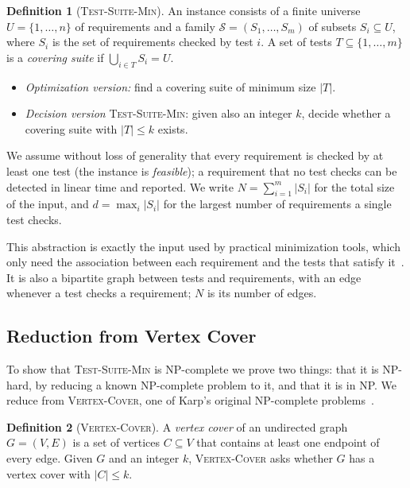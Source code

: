 \documentclass[conference]{IEEEtran}
\theoremstyle{definition}
\newtheorem{definition}{Definition}
\theoremstyle{remark}
\newcommand{\TSM}{\textsc{Test-Suite-Min}}
\newcommand{\VC}{\textsc{Vertex-Cover}}
\begin{document}
\begin{definition}[\TSM{}]
An instance consists of a finite universe $U = \{1,\dots,n\}$ of requirements
and a family $\mathcal{S} = (S_1,\dots,S_m)$ of subsets $S_i \subseteq U$,
where $S_i$ is the set of requirements checked by test $i$. A set of tests
$T \subseteq \{1,\dots,m\}$ is a \emph{covering suite} if
$\bigcup_{i\in T} S_i = U$.
\begin{itemize}
  \item \emph{Optimization version:} find a covering suite of minimum size $|T|$.
  \item \emph{Decision version} \TSM{}: given also an integer $k$, decide
        whether a covering suite with $|T| \le k$ exists.
\end{itemize}
\end{definition}

We assume without loss of generality that every requirement is checked by at
least one test (the instance is \emph{feasible}); a requirement that no test
checks can be detected in linear time and reported. We write
$N = \sum_{i=1}^{m} |S_i|$ for the total size of the input, and
$d = \max_i |S_i|$ for the largest number of requirements a single test checks.

This abstraction is exactly the input used by practical minimization tools,
which only need the association between each requirement and the tests that
satisfy it~\cite{harrold1993}. It is also a bipartite graph between tests and
requirements, with an edge whenever a test checks a requirement; $N$ is its
number of edges.

\subsection{Reduction from Vertex Cover}
To show that \TSM{} is NP-complete we prove two things: that it is NP-hard,
by reducing a known NP-complete problem to it, and that it is in NP. We
reduce from \VC{}, one of Karp's original NP-complete
problems~\cite{karp1972}.

\begin{definition}[\VC{}]
A \emph{vertex cover} of an undirected graph $G=(V,E)$ is a set of vertices
$C \subseteq V$ that contains at least one endpoint of every edge. Given $G$
and an integer $k$, \VC{} asks whether $G$ has a vertex cover with
$|C| \le k$.
\end{definition}
\end{document}
